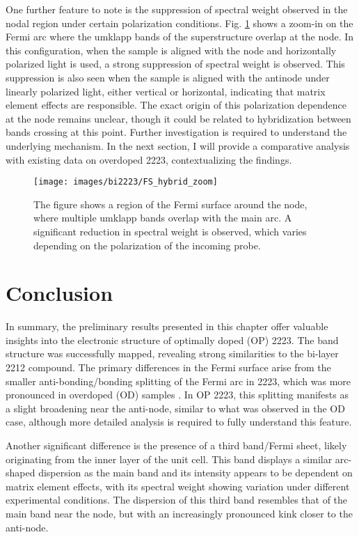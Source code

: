 One further feature to note is the suppression of spectral weight observed in the nodal region under certain polarization conditions.
Fig. \ref{fig:fs_hybrid} shows a zoom-in on the Fermi arc where the umklapp bands of the superstructure overlap at the node.
In this configuration, when the sample is aligned with the node and horizontally polarized light is used, a strong suppression of spectral weight is observed.
This suppression is also seen when the sample is aligned with the antinode under linearly polarized light, either vertical or horizontal, indicating that matrix element effects are responsible.
The exact origin of this polarization dependence at the node remains unclear, though it could be related to hybridization between bands crossing at this point.
Further investigation is required to understand the underlying mechanism.
In the next section, I will provide a comparative analysis with existing data on overdoped 2223, contextualizing the findings.

\begin{figure}[h!]
	\centering
	\texttt{[image: images/bi2223/FS\_hybrid\_zoom]}
	\caption{The figure shows a region of the Fermi surface around the node, where multiple umklapp bands overlap with the main arc. A significant reduction in spectral weight is observed, which varies depending on the polarization of the incoming probe.}
	\label{fig:fs_hybrid}
\end{figure}

\section{Conclusion}

In summary, the preliminary results presented in this chapter offer valuable insights into the electronic structure of optimally doped (OP) 2223.
The band structure was successfully mapped, revealing strong similarities to the bi-layer 2212 compound.
The primary differences in the Fermi surface arise from the smaller anti-bonding/bonding splitting of the Fermi arc in 2223, which was more pronounced in overdoped (OD) samples \cite{luo_electronic_2023}.
In OP 2223, this splitting manifests as a slight broadening near the anti-node, similar to what was observed in the OD case, although more detailed analysis is required to fully understand this feature.

Another significant difference is the presence of a third band/Fermi sheet, likely originating from the inner  layer of the unit cell.
This band displays a similar arc-shaped dispersion as the main band and its intensity appears to be dependent on matrix element effects, with its spectral weight showing variation under different experimental conditions.
The dispersion of this third band resembles that of the main band near the node, but with an increasingly pronounced kink closer to the anti-node.

